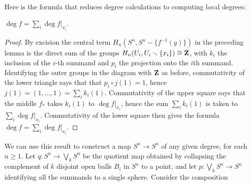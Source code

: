 Here is the formula that reduces degree calculations to computing local
degrees:
\begin{proposition}[2.30]
$\deg f=\sum_i\deg f|_{x_i}$.
\end{proposition}
\begin{proof}
By excision the central term $H_n(S^n,S^n\minus\{f^{-1}(y)\})$ in the
preceding lemma is the direct sum of the groups
$H_n(U_i,U_i\smallsetminus\{x_i\})\cong\mathbf{Z}$, with $k_i$ the inclusion of the
$i$-th  summand and $p_i$ the projection onto the $i$th
summand. Identifying the outer groups in the diagram with $\mathbf{Z}$ as before,
commutativity of the lower triangle says that that $p_i\circ j(1)=1$, hence
$j(1)=(1,\dotsc,1)=\sum_ik_i(1)$. Commutativity of the upper square says
that the middle $f_*$ takes $k_i(1)$ to $\deg f|_{x_i}$, hence the sum
$\sum_ik_i(1)$ is taken to $\sum_i\deg f|_{x_i}$. Commutativity of the
lower square then gives the formula $\deg f=\sum_i\deg f|_{x_i}$.
\end{proof}
\begin{example}[2.31]
We can use this result to construct a map $S^n\to S^n$ of any given degree,
for each $n\geq 1$. Let $q\colon S^n\to \bigvee_k S^n$ be the quotient map
obtained by collapsing the complement of $k$ disjoint open balls $B_i$ in
$S^n$ to a point, and let $p\colon\bigvee_k S^n\to S^n$ identifying all the
summands to a single sphere. Consider the composition
\end{example}

